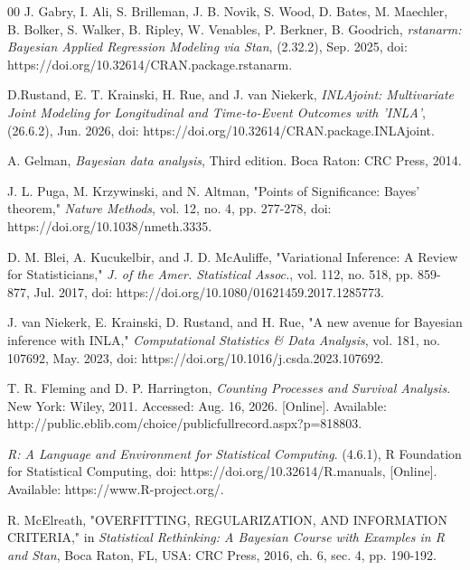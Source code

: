 \documentclass[english]{article}
\theoremstyle{plain}
\begin{document}
\begin{thebibliography}{00}
 J. Gabry, I. Ali, S. Brilleman, J. B. Novik, S. Wood, D. Bates, M. Maechler, B. Bolker, S. Walker, B. Ripley, W. Venables, P. Berkner, B. Goodrich, \emph{rstanarm: Bayesian Applied Regression Modeling via Stan}, (2.32.2), Sep. 2025, doi: https://doi.org/10.32614/CRAN.package.rstanarm.

 D.Rustand, E. T. Krainski, H. Rue, and J. van Niekerk, \emph{INLAjoint: Multivariate Joint Modeling for Longitudinal and Time-to-Event Outcomes with 'INLA'}, (26.6.2), Jun. 2026, doi: https://doi.org/10.32614/CRAN.package.INLAjoint.


 A. Gelman, \emph{Bayesian data analysis}, Third edition. Boca Raton: CRC Press, 2014.

 J. L. Puga, M. Krzywinski, and N. Altman, "Points of Significance: Bayes' theorem," \emph{Nature Methods}, vol. 12, no. 4, pp. 277-278, doi: https://doi.org/10.1038/nmeth.3335.

 D. M. Blei, A. Kucukelbir, and J. D. McAuliffe, "Variational Inference: A Review for Statisticians," \emph{J. of the Amer. Statistical Assoc.}, vol. 112, no. 518, pp. 859-877, Jul. 2017, doi: https://doi.org/10.1080/01621459.2017.1285773.

 J. van Niekerk, E. Krainski, D. Rustand, and H. Rue, "A new avenue for Bayesian inference with INLA," \emph{Computational Statistics \& Data Analysis}, vol. 181, no. 107692,  May. 2023, doi: https://doi.org/10.1016/j.csda.2023.107692.


 T. R. Fleming and D. P. Harrington, \emph{Counting Processes and Survival Analysis}. New York: Wiley, 2011. Accessed: Aug. 16, 2026. [Online]. Available: http://public.eblib.com/choice/publicfullrecord.aspx?p=818803.



  \emph{R: A Language and Environment for Statistical Computing}. (4.6.1), R Foundation for Statistical Computing, doi: https://doi.org/10.32614/R.manuals, [Online]. Available: https://www.R-project.org/.




 R. McElreath, "OVERFITTING, REGULARIZATION, AND INFORMATION CRITERIA," in \emph{Statistical Rethinking: A Bayesian Course with Examples in R and Stan}, Boca Raton, FL, USA: CRC Press, 2016, ch. 6, sec. 4, pp. 190-192.










\end{thebibliography}
\end{document}
